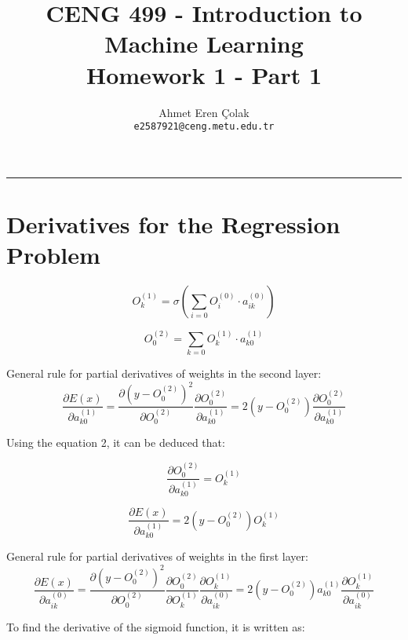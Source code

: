 \documentclass[12pt,a4paper, margin=1in]{article}
\author{
  Ahmet Eren Çolak\\
  \texttt{e2587921@ceng.metu.edu.tr}
}
\title{\textbf{CENG 499 - Introduction to Machine Learning} \\
Homework 1 - Part 1}
\begin{document}
\maketitle

\noindent\rule{19cm}{1.2pt}
\newcommand\ddfrac[2]{\frac{\displaystyle #1}{\displaystyle #2}}

\section*{Derivatives for the Regression Problem}

\begin{equation}
    O^{(1)}_k = \sigma{ \left ( \sum_{i=0}^{} O^{(0)}_i \cdot a^{(0)}_{ik} \right ) } 
\end{equation}

\begin{equation}
    O^{(2)}_0 = \sum_{k=0}^{} O^{(1)}_k \cdot a^{(1)}_{k0}
\end{equation}

\bigskip
General rule for partial derivatives of weights in the second layer:
\begin{equation*}
    \frac{\partial E(x)}{\partial a^{(1)}_{k0}} = \frac{\partial (y-O^{(2)}_0)^2}{\partial O^{(2)}_0}  \frac{\partial O^{(2)}_0}{\partial a^{(1)}_{k0}} = 2(y-O^{(2)}_0)\frac{\partial O^{(2)}_0}{\partial a^{(1)}_{k0}}
\end{equation*}

Using the equation 2, it can be deduced that:

\begin{equation*}
    \frac{\partial O^{(2)}_0}{\partial a^{(1)}_{k0}} = O^{(1)}_k
\end{equation*}

\begin{equation}
    \frac{\partial E(x)}{\partial a^{(1)}_{k0}} = 2(y-O^{(2)}_0) O^{(1)}_k
\end{equation}

\bigskip

General rule for partial derivatives of weights in the first layer:
\begin{equation*}
    \frac{\partial E(x)}{\partial a^{(0)}_{ik}} = \frac{\partial (y-O^{(2)}_0)^2}{\partial O^{(2)}_0}  \frac{\partial O^{(2)}_0}{\partial O^{(1)}_k} \frac{\partial O^{(1)}_k}{\partial a^{(0)}_{ik}} = 2(y-O^{(2)}_0)a^{(1)}_{k0} \frac{\partial O^{(1)}_k}{\partial a^{(0)}_{ik}}
\end{equation*}

To find the derivative of the sigmoid function, it is written as:
\end{document}
